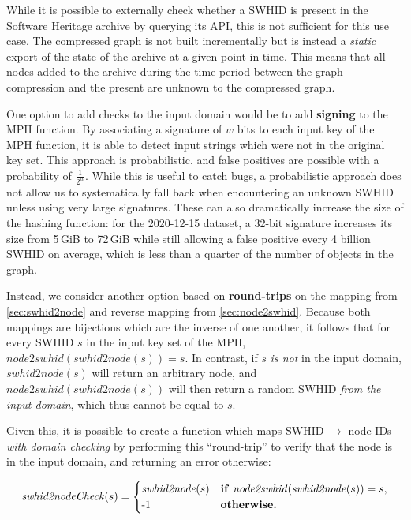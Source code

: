 While it is possible to externally check whether a \gls{SWHID} is present in
the Software Heritage archive by querying its API, this is not sufficient for
this use case. The compressed graph is not built incrementally but is instead a
\emph{static} export of the state of the archive at a given point in time. This
means that all nodes added to the archive during the time period between
the graph compression and the present are unknown to the compressed graph.

One option to add checks to the input domain would be to add \textbf{signing} to
the \gls{MPH} function. By associating a signature of $w$ bits to each input
key of the \gls{MPH} function, it is able to detect input strings which were
not in the original key set. This approach is probabilistic, and false
positives are possible with a probability of {\Large $\frac{1}{2^w}$}. While
this is useful to catch bugs, a probabilistic approach does not allow us to
systematically fall back when encountering an unknown \gls{SWHID} unless using
very large signatures. These can also dramatically increase the size of the
hashing function: for the 2020-12-15 dataset, a 32-bit signature increases its
size from 5\,GiB to 72\,GiB while still allowing a false positive every 4
billion \gls{SWHID} on average, which is less than a quarter of the number of
objects in the graph.

Instead, we consider another option based on \textbf{round-trips} on the
mapping from \cref{sec:swhid2node} and reverse mapping from
\cref{sec:node2swhid}.  Because both mappings are bijections which are
the inverse of one another, it follows that for every \gls{SWHID} $s$ in the
input key set of the \gls{MPH}, $\mathit{node2swhid}(\mathit{swhid2node}(s)) =
s$.  In contrast, if $s$ \emph{is not} in the input domain,
$\mathit{swhid2node}(s)$ will return an arbitrary node, and
$\mathit{node2swhid}(\mathit{swhid2node}(s))$ will then return a random
\gls{SWHID} \emph{from the input domain}, which thus cannot be equal to $s$.

Given this, it is possible to create a function which maps \gls{SWHID} $\to$
node IDs \emph{with domain checking} by performing this ``round-trip'' to
verify that the node is in the input domain, and returning an error otherwise:

\[
    \mathit{swhid2nodeCheck}(s) =
    \begin{cases}
        \mathit{swhid2node}(s) &
        \text{\textbf{if}}~\mathit{node2swhid}(\mathit{swhid2node}(s)) = s,\\
        \text{-1}            & \text{\textbf{otherwise.}}
    \end{cases}
\]

